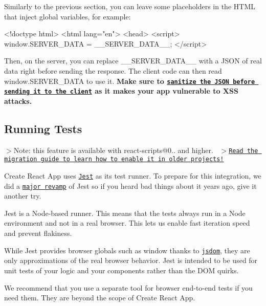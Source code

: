 Similarly to the previous section, you can leave some placeholders in the H\+T\+ML that inject global variables, for example\+:


\begin{DoxyCode}
<!doctype html>
<html lang="en">
  <head>
    <script>
      window.SERVER\_DATA = \_\_SERVER\_DATA\_\_;
    </script>
\end{DoxyCode}


Then, on the server, you can replace {\ttfamily \+\_\+\+\_\+\+S\+E\+R\+V\+E\+R\+\_\+\+D\+A\+T\+A\+\_\+\+\_\+} with a J\+S\+ON of real data right before sending the response. The client code can then read {\ttfamily window.\+S\+E\+R\+V\+E\+R\+\_\+\+D\+A\+TA} to use it. {\bfseries Make sure to \href{https://medium.com/node-security/the-most-common-xss-vulnerability-in-react-js-applications-2bdffbcc1fa0}{\tt sanitize the J\+S\+ON before sending it to the client} as it makes your app vulnerable to X\+SS attacks.}

\subsection*{Running Tests}

$>$Note\+: this feature is available with {\ttfamily react-\/scripts@0..} and higher.~\newline
 $>$\href{https://github.com/facebookincubator/create-react-app/blob/master/CHANGELOG.md#migrating-from-023-to-030}{\tt Read the migration guide to learn how to enable it in older projects!}

Create React App uses \href{https://facebook.github.io/jest/}{\tt Jest} as its test runner. To prepare for this integration, we did a \href{https://facebook.github.io/jest/blog/2016/09/01/jest-15.html}{\tt major revamp} of Jest so if you heard bad things about it years ago, give it another try.

Jest is a Node-\/based runner. This means that the tests always run in a Node environment and not in a real browser. This lets us enable fast iteration speed and prevent flakiness.

While Jest provides browser globals such as {\ttfamily window} thanks to \href{https://github.com/tmpvar/jsdom}{\tt jsdom}, they are only approximations of the real browser behavior. Jest is intended to be used for unit tests of your logic and your components rather than the D\+OM quirks.

We recommend that you use a separate tool for browser end-\/to-\/end tests if you need them. They are beyond the scope of Create React App.

